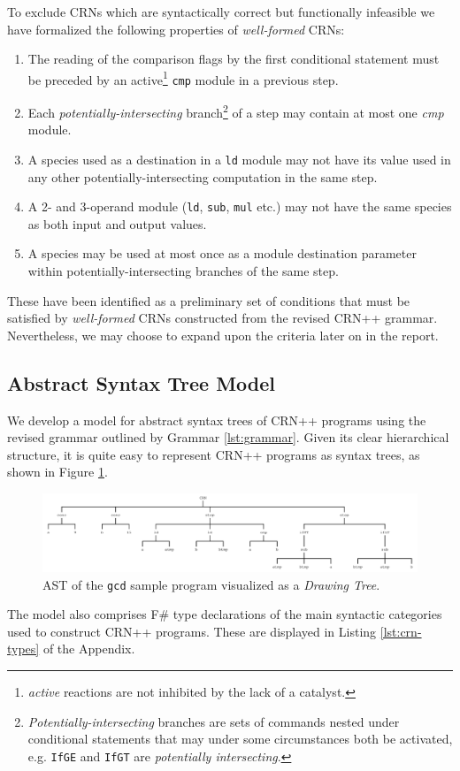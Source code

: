 To exclude CRNs which are syntactically correct but functionally infeasible we have formalized the following properties of \textit{well-formed} CRNs:
\begin{enumerate}
    \item The reading of the comparison flags by the first conditional statement must be preceded by an active\footnote{\textit{active} reactions are not inhibited by the lack of a catalyst.} \texttt{cmp} module in a previous step. \label{prop:initCmp}
    \item Each \textit{potentially-intersecting} branch\footnote{\textit{Potentially-intersecting} branches are sets of commands nested under conditional statements that may under some circumstances both be activated, e.g. \texttt{IfGE} and \texttt{IfGT} are \textit{potentially intersecting}.} of a step may contain at most one \textit{cmp} module. \label{prop:singleCmp}
    \item A species used as a destination in a \texttt{ld} module may not have its value used in any other potentially-intersecting computation in the same step. \label{prop:noLoadUse}
    \item A 2- and 3-operand module (\texttt{ld}, \texttt{sub}, \texttt{mul} etc.) may not have the same species as both input and output values. \label{prop:notSameIO}
    \item A species may be used at most once as a module destination parameter within potentially-intersecting branches of the same step. \label{prop:singleAssign}
\end{enumerate}
These have been identified as a preliminary set of conditions that must be satisfied by \textit{well-formed} CRNs constructed from the revised CRN++ grammar. Nevertheless, we may choose to expand upon the criteria later on in the report. 

\subsection{Abstract Syntax Tree Model} %
We develop a model for abstract syntax trees of CRN++ programs using the revised grammar outlined by Grammar \ref{lst:grammar}. Given its clear hierarchical structure, it is quite easy to represent CRN++ programs as syntax trees, as shown in Figure \ref{fig:ast}.
\begin{figure}[H]
    \centering
    \includegraphics[width=\textwidth]{Figures/gcd-tree.pdf}
    \caption{AST of the \texttt{gcd} sample program visualized as a \textit{Drawing Tree}.}
    \label{fig:ast}
\end{figure}
The model also comprises F\# type declarations of the main syntactic categories used to construct CRN++ programs. These are displayed in Listing \ref{lst:crn-types} of the Appendix.

